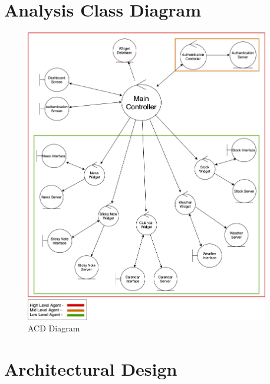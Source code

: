 \documentclass[]{article}
\begin{document}
\section{Analysis Class Diagram}
\label{sec:analysis_class_diagram}
\begin{figure}[!ht]
\begin{center}
\includegraphics[width=0.95\textwidth]{ACD.png}
\end{center}
\caption{ACD Diagram}
\label{fig:Analysis Class diagram}
\end{figure}

\section{Architectural Design}
\label{sec:architectural_design}
\end{document}
